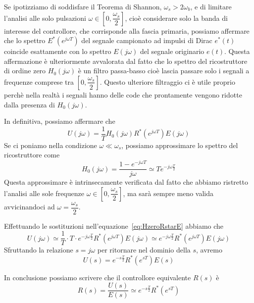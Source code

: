 \documentclass[a4paper]{report}
\begin{document}
Se ipotizziamo di soddisfare il Teorema di Shannon, $\omega_s >
2\omega_b$, e di limitare l'analisi alle solo pulsazioni $\omega \in
\left[ 0, \dfrac{\omega_s}{2}\right]$, cio\`e considerare solo la
banda di interesse del controllore, che corrisponde alla fascia
primaria, possiamo affermare che lo spettro $E^{*}(e^{j \omega T})$
del segnale campionato ad impulsi di Dirac $e^{*}(t)$ coincide
esattamente con lo spettro $E(j \omega)$ del segnale originario
$e(t)$. Questa affermazione \`e ulteriormente avvalorata dal fatto che
lo spettro del ricostruttore di ordine zero $H_0(j \omega)$ \`e un
filtro passa-basso cio\`e lascia passare solo i segnali a frequenze
comprese tra $\left[ 0, \dfrac{\omega_s}{2}\right]$. Questo ulteriore
filtraggio ci \`e utile proprio perch\`e nella realt\`a i segnali
hanno delle code che prontamente vengono ridotte dalla presenza di
$H_0(j \omega)$. 

In definitiva, possiamo affermare che
\begin{equation}\label{eq:HzeroRstarE}
  U(j \omega) = \dfrac{1}{T} H_0(j \omega) R^{*}(e^{j \omega T})E(j
  \omega) 
\end{equation}
Se ci poniamo nella condizione $\omega \ll \omega_s$, possiamo
approssimare lo spettro del ricostruttore come
\[
H_0(j \omega) = \dfrac{1 - e^{-j \omega T}}{j \omega} \simeq Te^{-j
  \omega \frac{T}{2}}
\]
Questa approssimare \`e intrinsecamente verificata dal fatto che
abbiamo ristretto l'analisi alle sole frequenze $\omega \in \left[ 0,
  \dfrac{\omega_s}{2}\right]$, ma sar\`a sempre meno valida
avvicinandoci ad $\omega = \dfrac{\omega_s}{2}$.

Effettuando le sostituzioni nell'equazione~\ref{eq:HzeroRstarE}
abbiamo che
\[
U(j \omega) \simeq \dfrac{1}{T} \cdot T \cdot e^{-j \omega
  \frac{T}{2}}R^{*}(e^{j \omega T}) E(j \omega) \simeq  e^{-j \omega
  \frac{T}{2}} R^{*}(e^{j \omega T}) E(j \omega)
\]
Sfruttando la relazione $s = j\omega$ per ritornare nel dominio della
$s$, avremo
\[
U(s) = e^{-s \frac{T}{2}} R^{*}(e^{sT}) E(s)
\]

In conclusione possiamo scrivere che il controllore equivalente $R(s)$
\`e
\begin{equation}\label{eq:controlloreEquivalenteRs}
  R(s) = \dfrac{U(s)}{E(s)} \simeq e^{-s \frac{T}{2}} R^{*}(e^{sT})
\end{equation}
\end{document}
